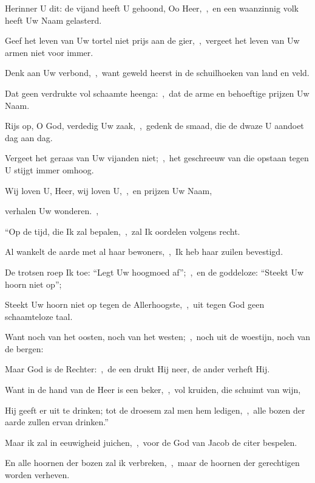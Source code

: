 \documentclass[12pt,twoside,a5paper]{article}
\begin{document}

\begin{halfparskip}
  Herinner U dit: de vijand heeft U gehoond, Oo Heer,~\sep\ en een waanzinnig volk heeft Uw Naam gelasterd.

  Geef het leven van Uw tortel niet prijs aan de gier,~\sep\ vergeet het leven van Uw armen niet voor immer.

  Denk aan Uw verbond,~\sep\ want geweld heerst in de schuilhoeken van land en veld.

  Dat geen verdrukte vol schaamte heenga:~\sep\ dat de arme en behoeftige prijzen Uw Naam.

  Rijs op, O God, verdedig Uw zaak,~\sep\ gedenk de smaad, die de dwaze U aandoet dag aan dag.

  Vergeet het geraas van Uw vijanden niet;~\sep\ het geschreeuw van die opstaan tegen U stijgt immer omhoog.
\end{halfparskip}




\begin{halfparskip}
  Wij loven U, Heer, wij loven U,~\sep\ en prijzen Uw Naam,


  verhalen Uw wonderen.~\sep

  ``Op de tijd, die Ik zal bepalen,~\sep\ zal Ik oordelen volgens recht.

  Al wankelt de aarde met al haar bewoners,~\sep\ Ik heb haar zuilen bevestigd.

  De trotsen roep Ik toe: ``Legt Uw hoogmoed af'';~\sep\ en de goddeloze: ``Steekt Uw hoorn niet op'';

  Steekt Uw hoorn niet op tegen de Allerhoogste,~\sep\ uit tegen God geen schaamteloze taal.

  Want noch van het oosten, noch van het westen;~\sep\ noch uit de woestijn, noch van de bergen:

  Maar God is de Rechter:~\sep\ de een drukt Hij neer, de ander verheft Hij.

  Want in de hand van de Heer is een beker,~\sep\ vol kruiden, die schuimt van wijn,

  Hij geeft er uit te drinken; tot de droesem zal men hem ledigen,~\sep\ alle bozen der aarde zullen ervan drinken.''

  Maar ik zal in eeuwigheid juichen,~\sep\ voor de God van Jacob de citer bespelen.

  En alle hoornen der bozen zal ik verbreken,~\sep\ maar de hoornen der gerechtigen worden verheven.
\end{halfparskip}
\end{document}
